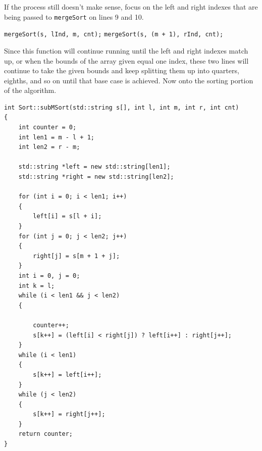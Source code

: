 \documentclass[letterpaper, 10pt]{article}
\begin{document}
If the process still doesn't make sense, focus on the left and right indexes that are being passed to \texttt{mergeSort} on lines 9 and 10. 

\begin{center}
		\texttt{mergeSort(s, lInd, m, cnt);} \break
		\texttt{mergeSort(s, (m + 1), rInd, cnt);}
\end{center}

 Since this function will continue running until the left and right indexes match up, or when the bounds of the array given equal one index, these two lines will continue to take the given bounds and keep splitting them up into quarters, eighths, and so on until that base case is achieved. Now onto the sorting portion of the algorithm.
 
 \begin{addmargin}[-5em]{1em}
\begin{small}
\begin{verbatim}
int Sort::subMSort(std::string s[], int l, int m, int r, int cnt)
{
	int counter = 0;
	int len1 = m - l + 1;
	int len2 = r - m;

	std::string *left = new std::string[len1];
	std::string *right = new std::string[len2];

	for (int i = 0; i < len1; i++)
	{
		left[i] = s[l + i];
	}
	for (int j = 0; j < len2; j++)
	{
		right[j] = s[m + 1 + j];
	}
	int i = 0, j = 0;
	int k = l;
	while (i < len1 && j < len2)
	{

		counter++;
		s[k++] = (left[i] < right[j]) ? left[i++] : right[j++];
	}
	while (i < len1)
	{
		s[k++] = left[i++];
	}
	while (j < len2)
	{
		s[k++] = right[j++];
	}
	return counter;
}

\end{verbatim}
\end{small}
\end{addmargin}
\end{document}
